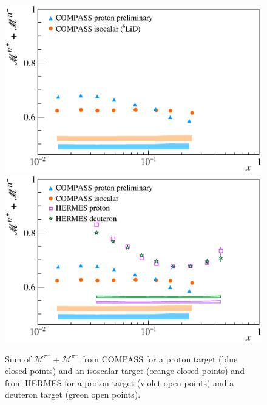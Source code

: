 \begin{figure}[!h]
  \centering
	\includegraphics[scale=0.5]{./gfx/Mult_pi_sum_noH.eps}
  \includegraphics[scale=0.5]{./gfx/Mult_pi_sum.eps}
  \caption{Sum of $\mathscr{M}^{\pi^+}+\mathscr{M}^{\pi^-}$ from COMPASS for a proton target (blue closed points) and an isoscalar target (orange closed points) and from HERMES for a proton target (violet open points) and a deuteron target (green open points).}
  \label{pic:pisum}
\end{figure}

